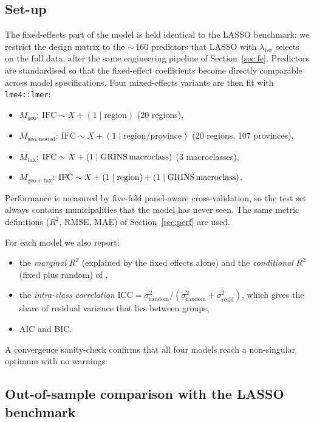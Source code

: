 \documentclass[11pt,a4paper]{article}
\begin{document}
\subsection{Set-up}

The fixed-effects part of the model is held identical to the LASSO
benchmark: we restrict the design matrix to the \(\sim\,160\)
predictors that LASSO with \(\lambda_{\mathrm{1se}}\) selects on the
full data, after the same engineering pipeline of
Section~\ref{sec:fe}. Predictors are standardised so that the
fixed-effect coefficients become directly comparable across model
specifications. Four mixed-effects variants are then fit with
\texttt{lme4::lmer}:
\begin{itemize}[leftmargin=2em]
  \item \(M_{\mathrm{geo}}\): \(\mathrm{IFC} \sim X + (1 \mid \text{region})\) (20 regions),
  \item \(M_{\mathrm{geo,nested}}\): \(\mathrm{IFC} \sim X + (1 \mid \text{region}/\text{province})\) (20 regions, 107 provinces),
  \item \(M_{\mathrm{tax}}\): \(\mathrm{IFC} \sim X + (1 \mid \text{GRINS\,macroclass})\) (3 macroclasses),
  \item \(M_{\mathrm{geo+tax}}\): \(\mathrm{IFC} \sim X + (1 \mid \text{region}) + (1 \mid \text{GRINS\,macroclass})\).
\end{itemize}
Performance is measured by five-fold panel-aware cross-validation, so
the test set always contains municipalities that the model has never
seen. The same metric definitions (\(R^{2}\), RMSE, MAE) of
Section~\ref{sec:perf} are used.

For each model we also report:
\begin{itemize}[leftmargin=2em]
\item the \emph{marginal} \(R^{2}\) (explained by the fixed effects alone) and the \emph{conditional} \(R^{2}\) (fixed plus random) of \citet{nakagawa2017},
\item the \emph{intra-class correlation} \(\mathrm{ICC} = \sigma^{2}_{\text{random}} / (\sigma^{2}_{\text{random}} + \sigma^{2}_{\text{resid}})\), which gives the share of residual variance that lies between groups,
\item AIC and BIC.
\end{itemize}
A convergence sanity-check confirms that all four models reach a
non-singular optimum with no warnings.

\subsection{Out-of-sample comparison with the LASSO benchmark}
\end{document}

